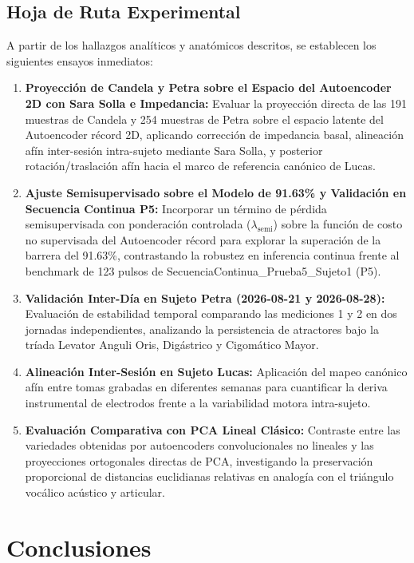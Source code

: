 \documentclass[11pt,a4paper]{article}
\begin{document}
\subsection{Hoja de Ruta Experimental}
\label{subsec:hoja_ruta_futura}

A partir de los hallazgos analíticos y anatómicos descritos, se establecen los siguientes ensayos inmediatos:
\begin{enumerate}
    \item \textbf{Proyección de Candela y Petra sobre el Espacio del Autoencoder 2D con Sara Solla e Impedancia:} Evaluar la proyección directa de las 191 muestras de Candela y 254 muestras de Petra sobre el espacio latente del Autoencoder récord 2D, aplicando corrección de impedancia basal, alineación afín inter-sesión intra-sujeto mediante Sara Solla, y posterior rotación/traslación afín hacia el marco de referencia canónico de Lucas.
    \item \textbf{Ajuste Semisupervisado sobre el Modelo de 91.63\% y Validación en Secuencia Continua P5:} Incorporar un término de pérdida semisupervisada con ponderación controlada ($\lambda_{\text{semi}}$) sobre la función de costo no supervisada del Autoencoder récord para explorar la superación de la barrera del 91.63\%, contrastando la robustez en inferencia continua frente al benchmark de 123 pulsos de SecuenciaContinua\_Prueba5\_Sujeto1 (P5).
    \item \textbf{Validación Inter-Día en Sujeto Petra (2026-08-21 y 2026-08-28):} Evaluación de estabilidad temporal comparando las mediciones 1 y 2 en dos jornadas independientes, analizando la persistencia de atractores bajo la tríada Levator Anguli Oris, Digástrico y Cigomático Mayor.
    \item \textbf{Alineación Inter-Sesión en Sujeto Lucas:} Aplicación del mapeo canónico afín entre tomas grabadas en diferentes semanas para cuantificar la deriva instrumental de electrodos frente a la variabilidad motora intra-sujeto.
    \item \textbf{Evaluación Comparativa con PCA Lineal Clásico:} Contraste entre las variedades obtenidas por autoencoders convolucionales no lineales y las proyecciones ortogonales directas de PCA, investigando la preservación proporcional de distancias euclidianas relativas en analogía con el triángulo vocálico acústico y articular.
\end{enumerate}

\section{Conclusiones}
\label{sec:conclusiones}
\end{document}
